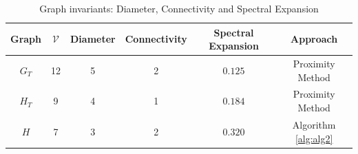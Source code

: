 \documentclass[reqno,8pt]{amsart}
\theoremstyle{definition}
\theoremstyle{remark}
\numberwithin{equation}{section}
\def\bof{{\bf f}}
\def\R{\mathbb{R}}
\def\cV{\mathcal{V}}
\begin{document}
\begin{center}
\begin{table}
\caption{Graph invariants: Diameter, Connectivity and Spectral Expansion}
\begin{tabular}{|c|c|c|c|c|c|} 
	\hline
	Graph & $\cV$ & Diameter & Connectivity & Spectral Expansion & Approach\\
	\hline
    $G_T$ & 12 & 5 & 2 & $0.125$ & Proximity Method \cite{teixeira_distributed_2014} \\
	\hline
    $H_T$ & 9 & 4 & 1 & $0.184$ & Proximity Method \cite{teixeira_distributed_2014}\\
	\hline
    $H$ & 7 & 3 & 2 & $0.320$ & Algorithm \ref{alg:alg2}\\
    \hline
\end{tabular}\label{tab:table1}
\end{table}
\end{center}
\end{document}
